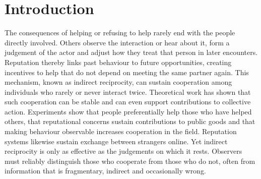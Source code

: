 %
\section*{Introduction}

The consequences of helping or refusing to help rarely end with the people directly involved. Others observe the interaction or hear about it, form a judgement of the actor and adjust how they treat that person in later encounters\cite{alexander1987,milinski2016}. Reputation thereby links past behaviour to future opportunities, creating incentives to help that do not depend on meeting the same partner again. This mechanism, known as indirect reciprocity, can sustain cooperation among individuals who rarely or never interact twice\cite{nowak1998,nowak2005}. Theoretical work has shown that such cooperation can be stable\cite{sugden1986,kandori1992,leimar2001,panchanathan2003} and can even support contributions to collective action\cite{panchanathan2004}. Experiments show that people preferentially help those who have helped others\cite{wedekind2000}, that reputational concerns sustain contributions to public goods\cite{milinski2002} and that making behaviour observable increases cooperation in the field\cite{yoeli2013}. Reputation systems likewise sustain exchange between strangers online\cite{tadelis2016}. Yet indirect reciprocity is only as effective as the judgements on which it rests. Observers must reliably distinguish those who cooperate from those who do not, often from information that is fragmentary, indirect and occasionally wrong.

